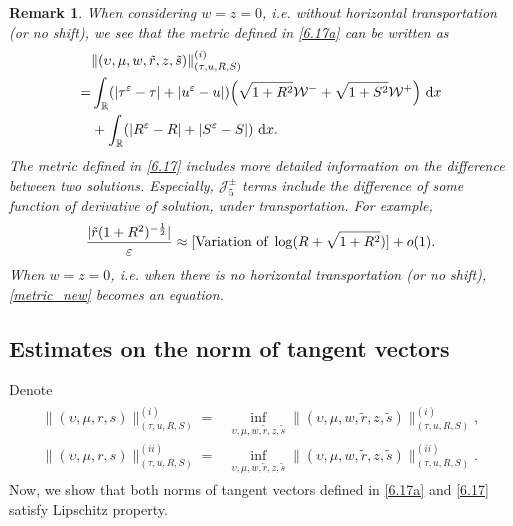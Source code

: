 \documentclass[11pt,reqno]{article}
\newtheorem{rem}{Remark}
\newcommand{\eps}{\varepsilon}
\numberwithin{equation}{section}
\begin{document}
\begin{rem}\label{rem_12}
When considering $w=z=0$, i.e. without horizontal transportation (or no shift), we see that the metric defined in \eqref{6.17a} can be written as
\begin{align}\label{6.19a}
\begin{split}
&\|(\upsilon, \mu, w, \tilde{r}, z, \tilde{s})\|_{(\tau, u, R, S)}^{(i)} \\
=&\int_{\mathbb{R}}(|\tau^\eps -\tau|+|u^\eps-u|)\Big(\sqrt{1+R^2}\mathcal{W}^- +\sqrt{1+S^2}\mathcal{W}^+\Big)\ {\rm d}x  \\
&+\int_{\mathbb{R}}(|R^\eps -R|+|S^\eps-S|)\ {\rm d}x.
\end{split}
\end{align}
The metric defined in \eqref{6.17} includes more detailed information on the difference between two solutions. Especially,
$\mathcal{J}_{5}^\pm$ terms include the difference of some function of derivative of solution, under transportation. For example,
\begin{equation}
\label{metric_new}
\frac{|\tilde{r}(1+R^2)^{-\frac{1}{2}}|}{\varepsilon}
\approx[\hbox{Variation of }\log(R+\sqrt{1+R^2})]+
o(1).
\end{equation}
When $w=z=0$, i.e. when there is no horizontal transportation (or no shift), \eqref{metric_new} becomes an equation.
\end{rem}




\subsection{Estimates on the norm of tangent vectors}\label{S63}

Denote
\begin{align*}
\begin{split}
\|(\upsilon, \mu, r, s)\|_{(\tau, u, R, S)}^{(i)}=&\inf_{\upsilon, \mu, w, \tilde{r}, z, \tilde{s}}\|(\upsilon, \mu, w, \tilde{r}, z, \tilde{s})\|_{(\tau, u, R, S)}^{(i)},\\
\|(\upsilon, \mu, r, s)\|_{(\tau, u, R, S)}^{(ii)}=&\inf_{\upsilon, \mu, w, \tilde{r}, z, \tilde{s}}\|(\upsilon, \mu, w, \tilde{r}, z, \tilde{s})\|_{(\tau, u, R, S)}^{(ii)}.
\end{split}
\end{align*}
Now, we show that both norms of tangent vectors defined in \eqref{6.17a} and \eqref{6.17} satisfy Lipschitz property.
\end{document}

